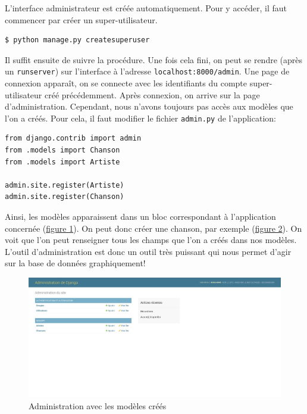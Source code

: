 \documentclass[a4paper, 10pt]{article}
\begin{document}
L'interface administrateur est créée automatiquement. Pour y accéder, il faut commencer par créer un super-utilisateur.

\begin{verbatim}
$ python manage.py createsuperuser
\end{verbatim}

Il suffit ensuite de suivre la procédure. Une fois cela fini, on peut se rendre (après un \texttt{runserver}) sur l'interface à l'adresse \texttt{localhost:8000/admin}. Une page de connexion apparaît, on se connecte avec les identifiants du compte super-utilisateur créé précédemment. Après connexion, on arrive sur la page d'administration. Cependant, nous n'avons toujours pas accès aux modèles que l'on a créés. Pour cela, il faut modifier le fichier \texttt{admin.py} de l'application:
\begin{verbatim}
from django.contrib import admin
from .models import Chanson
from .models import Artiste

admin.site.register(Artiste)
admin.site.register(Chanson)
\end{verbatim}
Ainsi, les modèles apparaissent dans un bloc correspondant à l'application concernée (\hyperref[admin2]{figure 1}). On peut donc créer une chanson, par exemple (\hyperref[admin3]{figure 2}). On voit que l'on peut renseigner tous les champs que l'on a créés dans nos modèles. L'outil d’administration est donc un outil très puissant qui nous permet d'agir sur la base de données graphiquement!
\begin{figure}[h]
    \begin{center}
        \includegraphics[width=15 cm]{django/admin2.jpg}
        \caption{Administration avec les modèles créés}\label{admin2}
    \end{center}
\end{figure}
\end{document}
